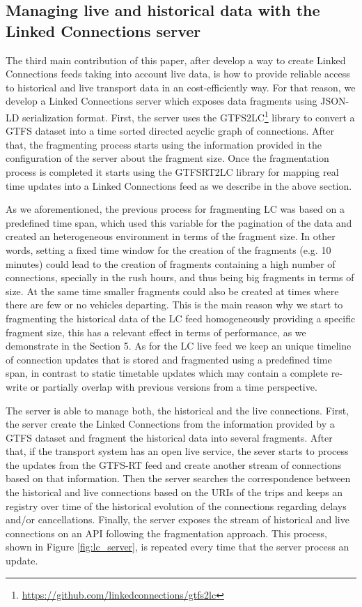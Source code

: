\documentclass[sw]{iosart2x}
\begin{document}
	
	\subsection{Managing live and historical data with the Linked Connections server}\label{live_historical_lc}
	The third main contribution of this paper, after develop a way to create Linked Connections feeds taking into account live data, is how to provide reliable access to historical and live transport data in an cost-efficiently way. For that reason, we develop a Linked Connections server which exposes data fragments using JSON-LD serialization format. First, the server uses the GTFS2LC\footnote{\url{https://github.com/linkedconnections/gtfs2lc}} library to convert a GTFS dataset into a time sorted directed acyclic graph of connections. After that, the fragmenting process starts using the information provided in the configuration of the server about the fragment size. Once the fragmentation process is completed it starts using the GTFSRT2LC library for mapping real time updates into a Linked Connections feed as we describe in the above section. 
	
	As we aforementioned, the previous process for fragmenting LC was based on a predefined time span, which used this variable for the pagination of the data and created an heterogeneous environment in terms of the fragment size. In other words, setting a fixed time window for the creation of the fragments (e.g. 10 minutes) could lead to the creation of fragments containing a high number of connections, specially in the rush hours, and thus being big fragments in terms of size. At the same time smaller fragments could also be created at times where there are few or no vehicles departing. This is the main reason why we start to fragmenting the historical data of the LC feed homogeneously providing a specific fragment size, this has a relevant effect in terms of performance, as we demonstrate in the Section 5. As for the LC live feed we keep an unique timeline of connection updates that is stored and fragmented using a predefined time span, in contrast to static timetable updates which may contain a complete re-write or partially overlap with previous versions from a time perspective. 
	
	The server is able to manage both, the historical and the live connections. First, the server create the Linked Connections from the information provided by a GTFS dataset and fragment the historical data into several fragments. After that, if the transport system has an open live service, the sever starts to process the updates from the GTFS-RT feed and create another stream of connections based on that information. Then the server searches the correspondence between the historical and live connections based on the URIs of the trips and keeps an registry over time of the historical evolution of the connections regarding delays and/or cancellations. Finally, the server exposes the stream of historical and live connections on an API following the fragmentation approach. This process, shown in Figure \ref{fig:lc_server}, is repeated every time that the server process an update.
	
\end{document}
